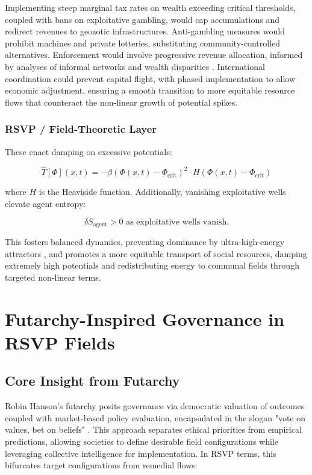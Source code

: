 \documentclass[11pt]{article}
\begin{document}
Implementing steep marginal tax rates on wealth exceeding critical thresholds, coupled with bans on exploitative gambling, would cap accumulations and redirect revenues to geozotic infrastructures. Anti-gambling measures would prohibit machines and private lotteries, substituting community-controlled alternatives. Enforcement would involve progressive revenue allocation, informed by analyses of informal networks and wealth disparities \citep{fafchamps2000ethnicity}. International coordination could prevent capital flight, with phased implementation to allow economic adjustment, ensuring a smooth transition to more equitable resource flows that counteract the non-linear growth of potential spikes.

\subsubsection{RSVP / Field-Theoretic Layer}

These enact damping on excessive potentials:

\begin{equation}
\hat{T}[\Phi](x, t) = -\beta \left( \Phi(x, t) - \Phi_{\text{crit}} \right)^2 \cdot H\left( \Phi(x, t) - \Phi_{\text{crit}} \right)
\end{equation}

where $H$ is the Heaviside function. Additionally, vanishing exploitative wells elevate agent entropy:

\begin{equation}
\delta S_{\text{agent}} > 0 \text{ as exploitative wells vanish.}
\end{equation}

This fosters balanced dynamics, preventing dominance by ultra-high-energy attractors \citep{villani2009optimal}, and promotes a more equitable transport of social resources, damping extremely high potentials and redistributing energy to communal fields through targeted non-linear terms.

\section{Futarchy-Inspired Governance in RSVP Fields}

\subsection{Core Insight from Futarchy}

Robin Hanson's futarchy posits governance via democratic valuation of outcomes coupled with market-based policy evaluation, encapsulated in the slogan "vote on values, bet on beliefs" \citep{hanson2007shall, hanson2000futarchy}. This approach separates ethical priorities from empirical predictions, allowing societies to define desirable field configurations while leveraging collective intelligence for implementation. In RSVP terms, this bifurcates target configurations from remedial flows:
\end{document}
